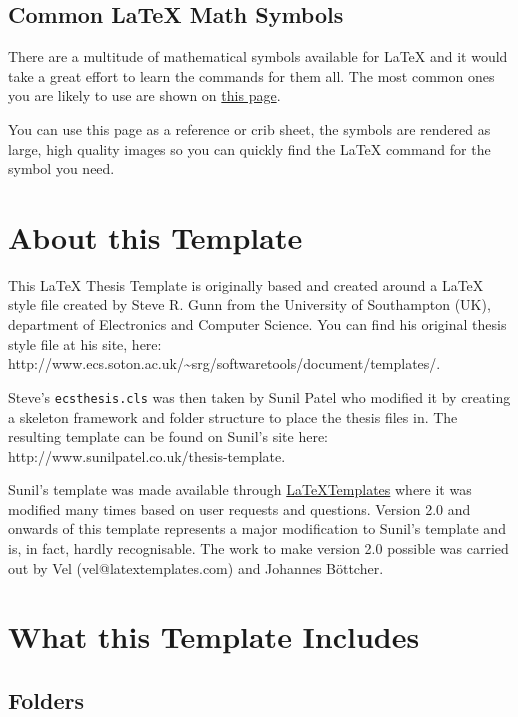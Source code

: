 \documentclass[
  letterpaper,
  11pt,
  english,
  singlespacing,
  headsepline]{MastersDoctoralThesis}
\begin{document}
\subsection{\texorpdfstring{Common \LaTeX{} Math
Symbols}{Common  Math Symbols}}\label{common-math-symbols}

There are a multitude of mathematical symbols available for \LaTeX{} and
it would take a great effort to learn the commands for them all. The
most common ones you are likely to use are shown on
\href{http://www.sunilpatel.co.uk/latex-type/latex-math-symbols/}{this
page}.

You can use this page as a reference or crib sheet, the symbols are
rendered as large, high quality images so you can quickly find the
\LaTeX{} command for the symbol you need.

\section{About this Template}\label{about-this-template}

This \LaTeX{} Thesis Template is originally based and created around a
\LaTeX{} style file created by Steve R. Gunn from the University of
Southampton (UK), department of Electronics and Computer Science. You
can find his original thesis style file at his site, here:
http://www.ecs.soton.ac.uk/\textasciitilde srg/softwaretools/document/templates/.

Steve's \texttt{ecsthesis.cls} was then taken by Sunil Patel who
modified it by creating a skeleton framework and folder structure to
place the thesis files in. The resulting template can be found on
Sunil's site here: http://www.sunilpatel.co.uk/thesis-template.

Sunil's template was made available through
\href{http://www.LaTeXTemplates.com}{LaTeXTemplates} where it was
modified many times based on user requests and questions. Version 2.0
and onwards of this template represents a major modification to Sunil's
template and is, in fact, hardly recognisable. The work to make version
2.0 possible was carried out by Vel (vel@latextemplates.com) and
Johannes Böttcher.

\section{What this Template Includes}\label{what-this-template-includes}

\subsection{Folders}\label{folders}
\end{document}
